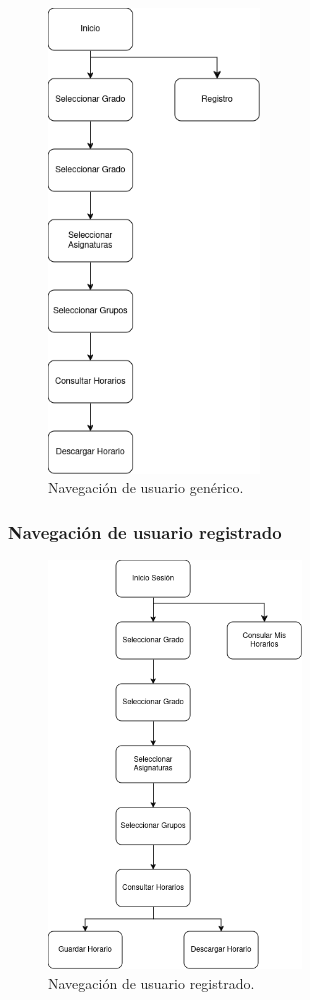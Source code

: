 \begin{figure}[H]
    \centering
    \includegraphics[width=0.5\textwidth]{./imagenes/Navegacion_sin_registro_Diagram.png}
    \caption{Navegación de usuario genérico.}
    \label{fig:navegacion_sin_registro}
\end{figure}

\subsubsection*{Navegación de usuario registrado}

\begin{figure}[H]
    \centering
    \includegraphics[width=0.6\textwidth]{./imagenes/Navegacion_Diagram.png}
    \caption{Navegación de usuario registrado.}
    \label{fig:navegacion_registro}
\end{figure}
